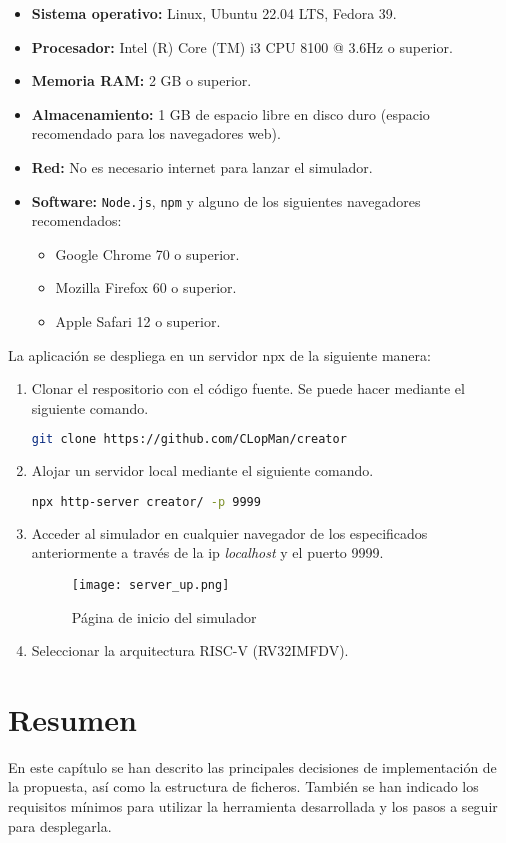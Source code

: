 \begin{itemize}
    \item \textbf{Sistema operativo:} Linux, Ubuntu 22.04 LTS, Fedora 39.
    \item \textbf{Procesador:} Intel (R) Core (TM) i3 CPU 8100 @ 3.6Hz o superior.
    \item \textbf{Memoria RAM:} 2 GB o superior.
    \item \textbf{Almacenamiento:} 1 GB de espacio libre en disco duro (espacio recomendado para los navegadores web).
    \item \textbf{Red:} No es necesario internet para lanzar el simulador.
    \item \textbf{Software:} \texttt{Node.js}, \texttt{npm} y alguno de los siguientes navegadores recomendados:
    \begin{itemize}
        \item Google Chrome 70 o superior.
        \item Mozilla Firefox 60 o superior.
        \item Apple Safari 12 o superior.
    \end{itemize}

\end{itemize}

La aplicación se despliega en un servidor npx de la siguiente manera:
\begin{enumerate}
    \item Clonar el respositorio con el código fuente. Se puede hacer mediante el siguiente comando.
\begin{lstlisting}[language=bash, basicstyle=\scriptsize]
git clone https://github.com/CLopMan/creator
\end{lstlisting}
    \item Alojar un servidor local mediante el siguiente comando.
\begin{lstlisting}[language=bash, basicstyle=\scriptsize]
npx http-server creator/ -p 9999
\end{lstlisting}
    \item Acceder al simulador en cualquier navegador de los especificados anteriormente a través de la ip \textit{localhost} y el puerto 9999.
        \begin{figure}[H]
                \texttt{[image: server\_up.png]}
                \caption{Página de inicio del simulador}\label{fig:inicio-simulador}
        \end{figure}
    \item Seleccionar la arquitectura RISC-V (RV32IMFDV).
\end{enumerate}

\section{Resumen}

En este capítulo se han descrito las principales decisiones de implementación de la propuesta, así como la estructura de ficheros. También se han indicado los requisitos mínimos para utilizar la herramienta desarrollada y los pasos a seguir para desplegarla.
